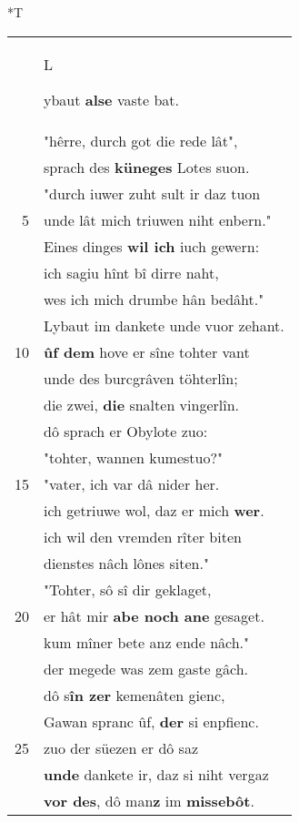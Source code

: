 \documentclass[8pt,a4paper,notitlepage]{article}
\begin{document}
\begin{table}[ht]
\begin{minipage}[t]{0.5\linewidth}
\end{minipage}
\hspace{0.5cm}
\begin{minipage}[t]{0.5\linewidth}
\small
\begin{center}*T
\end{center}
\begin{tabular}{rl}
 & \begin{large}L\end{large}ybaut \textbf{alse} vaste bat.\\ 
 & "hêrre, durch got die rede lât",\\ 
 & sprach des \textbf{küneges} Lotes suon.\\ 
 & "durch iuwer zuht sult ir daz tuon\\ 
5 & unde lât mich triuwen niht enbern."\\ 
 & Eines dinges \textbf{wil ich} iuch gewern:\\ 
 & ich sagiu hînt bî dirre naht,\\ 
 & wes ich mich drumbe hân bedâht."\\ 
 & Lybaut im dankete unde vuor zehant.\\ 
10 & \textbf{ûf dem} hove er sîne tohter vant\\ 
 & unde des burcgrâven töhterlîn;\\ 
 & die zwei, \textbf{die} snalten vingerlîn.\\ 
 & dô sprach er Obylote zuo:\\ 
 & "tohter, wannen kumestuo?"\\ 
15 & "vater, ich var dâ nider her.\\ 
 & ich getriuwe wol, daz er mich \textbf{wer}.\\ 
 & ich wil den vremden rîter biten\\ 
 & dienstes nâch lônes siten."\\ 
 & "Tohter, sô sî dir geklaget,\\ 
20 & er hât mir \textbf{abe noch ane} gesaget.\\ 
 & kum mîner bete anz ende nâch."\\ 
 & der megede was zem gaste gâch.\\ 
 & dô s\textbf{în zer} kemenâten gienc,\\ 
 & Gawan spranc ûf, \textbf{der} si enpfienc.\\ 
25 & zuo der süezen er dô saz\\ 
 & \textbf{unde} dankete ir, daz si niht vergaz\\ 
 & \textbf{vor des}, dô man\textbf{z} im \textbf{missebôt}.\\ 

\end{tabular}
\end{minipage}
\end{table}
\end{document}
